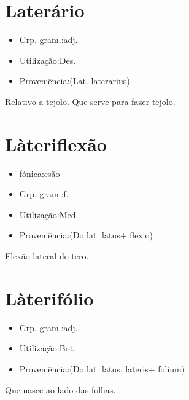 \section{Laterário}
\begin{itemize}
\item {Grp. gram.:adj.}
\end{itemize}
\begin{itemize}
\item {Utilização:Des.}
\end{itemize}
\begin{itemize}
\item {Proveniência:(Lat. \textunderscore laterarius\textunderscore )}
\end{itemize}
Relativo a tejolo.
Que serve para fazer tejolo.
\section{Làteriflexão}
\begin{itemize}
\item {fónica:csão}
\end{itemize}
\begin{itemize}
\item {Grp. gram.:f.}
\end{itemize}
\begin{itemize}
\item {Utilização:Med.}
\end{itemize}
\begin{itemize}
\item {Proveniência:(Do lat. \textunderscore latus\textunderscore  + \textunderscore flexio\textunderscore )}
\end{itemize}
Flexão lateral do tero.
\section{Làterifólio}
\begin{itemize}
\item {Grp. gram.:adj.}
\end{itemize}
\begin{itemize}
\item {Utilização:Bot.}
\end{itemize}
\begin{itemize}
\item {Proveniência:(Do lat. \textunderscore latus\textunderscore , \textunderscore lateris\textunderscore  + \textunderscore folium\textunderscore )}
\end{itemize}
Que nasce ao lado das folhas.
